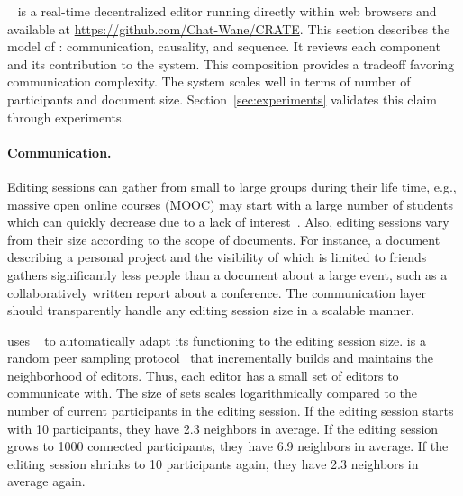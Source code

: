 \CRATE~\cite{nedelec2016crate} is a real-time decentralized editor running
directly within web browsers and available at
\url{https://github.com/Chat-Wane/CRATE}. 
This section describes the model of \CRATE: communication, causality, and
sequence.  It reviews each component and its contribution to the system. This
composition provides a tradeoff favoring communication complexity. The system
scales well in terms of number of participants and document
size. Section~\ref{sec:experiments} validates this claim through experiments.


\paragraph{Communication.}
Editing sessions can gather from small to large groups during their life time,
e.g., massive open online courses (MOOC) may start with a large number of
students which can quickly decrease due to a lack of
interest~\cite{breslow2013studying}. Also, editing sessions vary from their size
according to the scope of documents. For instance, a document describing a
personal project and the visibility of which is limited to friends gathers
significantly less people than a document about a large event, such as a
collaboratively written report about a conference. The communication layer
should transparently handle any editing session size in a scalable manner.


\CRATE uses \SPRAY~\cite{nedelec2015spray} to automatically adapt its
functioning to the editing session size. \SPRAY is a random peer sampling
protocol~\cite{jelasity2007gossip} that incrementally builds and maintains the
neighborhood of editors. Thus, each editor has a small set of editors to
communicate with. The size of sets scales logarithmically compared to the number
of current participants in the editing session. If the editing session starts
with 10 participants, they have 2.3 neighbors in average. If the editing session
grows to 1000 connected participants, they have 6.9 neighbors in average. If the
editing session shrinks to 10 participants again, they have 2.3 neighbors in
average again.

